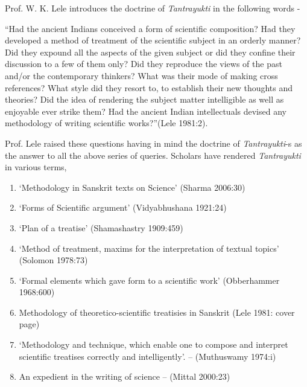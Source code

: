 Prof. W. K. Lele introduces the doctrine of \textit{Tantrayukti} in the following words -

“Had the ancient Indians conceived a form of scientific composition? Had they developed a method of treatment of the scientific subject in an orderly manner? Did they expound all the aspects of the given subject or did they confine their discussion to a few of them only? Did they reproduce the views of the past and/or the contemporary thinkers? What was their mode of making cross references? What style did they resort to, to establish their new thoughts and theories? Did the idea of rendering the subject matter intelligible as well as enjoyable ever strike them? Had the ancient Indian intellectuals devised any methodology of writing scientific works?”\hfill (Lele 1981:2).

Prof. Lele raised these questions having in mind the doctrine of \textit{Tantrayukti}-s as the answer to all the above series of queries. Scholars have rendered \textit{Tantrayukti} in various terms,

\begin{enumerate}[{\rm i)}]
\itemsep=0pt
\item ‘Methodology in Sanskrit texts on Science’ (Sharma 2006:30)

 \item ‘Forms of Scientific argument’ (Vidyabhushana 1921:24) 

 \item ‘Plan of a treatise’ (Shamashastry 1909:459)

 \item ‘Method of treatment, maxims for the interpretation of textual topics’ (Solomon 1978:73) 

 \item ‘Formal elements which gave form to a scientific work’ (Obberhammer 1968:600)

 \item Methodology of theoretico-scientific treatisies in Sanskrit (Lele 1981: cover page)

 \item ‘Methodology and technique, which enable one to compose and interpret scientific treatises correctly and intelligently’. – (Muthuswamy 1974:i)

 \item An expedient in the writing of science – (Mittal 2000:23)

\end{enumerate}

